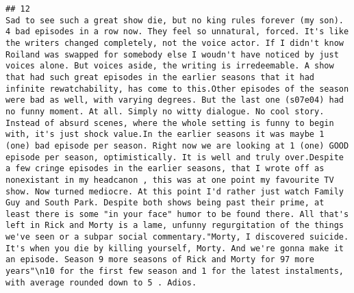\documentclass[
]{article}
\begin{document}
\begin{verbatim}
## 12                                                                                                                                                                                                                                                                                                                                                                                                                                                                                                                                                                                                                                                                                                                                                                 Sad to see such a great show die, but no king rules forever (my son). 4 bad episodes in a row now. They feel so unnatural, forced. It's like the writers changed completely, not the voice actor. If I didn't know Roiland was swapped for somebody else I woudn't have noticed by just voices alone. But voices aside, the writing is irredeemable. A show that had such great episodes in the earlier seasons that it had infinite rewatchability, has come to this.Other episodes of the season were bad as well, with varying degrees. But the last one (s07e04) had no funny moment. At all. Simply no witty dialogue. No cool story. Instead of absurd scenes, where the whole setting is funny to begin with, it's just shock value.In the earlier seasons it was maybe 1 (one) bad episode per season. Right now we are looking at 1 (one) GOOD episode per season, optimistically. It is well and truly over.Despite a few cringe episodes in the earlier seasons, that I wrote off as nonexistant in my headcanon , this was at one point my favourite TV show. Now turned mediocre. At this point I'd rather just watch Family Guy and South Park. Despite both shows being past their prime, at least there is some "in your face" humor to be found there. All that's left in Rick and Morty is a lame, unfunny regurgitation of the things we've seen or a subpar social commentary."Morty, I discovered suicide. It's when you die by killing yourself, Morty. And we're gonna make it an episode. Season 9 more seasons of Rick and Morty for 97 more years"\n10 for the first few season and 1 for the latest instalments, with average rounded down to 5 . Adios.

\end{verbatim}
\end{document}
